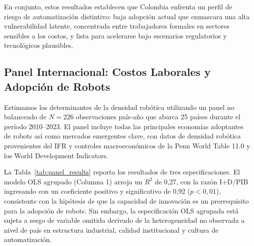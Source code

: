 \documentclass{article}
\begin{document}
\noindent En conjunto, estos resultados establecen que Colombia enfrenta un perfil de riesgo de automatizaci\'on distintivo: baja adopci\'on actual que enmascara una alta vulnerabilidad latente, concentrada entre trabajadores formales en sectores sensibles a los costos, y lista para acelerarse bajo escenarios regulatorios y tecnol\'ogicos plausibles.

\subsection{Panel Internacional: Costos Laborales y Adopci\'on de Robots}
\label{subsec:panel_results}

Estimamos los determinantes de la densidad rob\'otica utilizando un panel no balanceado de $N = 226$ observaciones pa\'is-a\~no que abarca 25 pa\'ises durante el per\'iodo 2010--2023. El panel incluye todas las principales econom\'ias adoptantes de robots as\'i como mercados emergentes clave, con datos de densidad rob\'otica provenientes del IFR \cite{ifr2024} y controles macroecon\'omicos de la Penn World Table 11.0 y los World Development Indicators.

La Tabla~\ref{tab:panel_results} reporta los resultados de tres especificaciones. El modelo OLS agrupado (Columna 1) arroja un $R^2$ de 0,27, con la raz\'on I+D/PIB ingresando con un coeficiente positivo y significativo de 0,92 ($p < 0,01$), consistente con la hip\'otesis de que la capacidad de innovaci\'on es un prerrequisito para la adopci\'on de robots. Sin embargo, la especificaci\'on OLS agrupada est\'a sujeta a sesgo de variable omitida derivado de la heterogeneidad no observada a nivel de pa\'is en estructura industrial, calidad institucional y cultura de automatizaci\'on.
\end{document}
